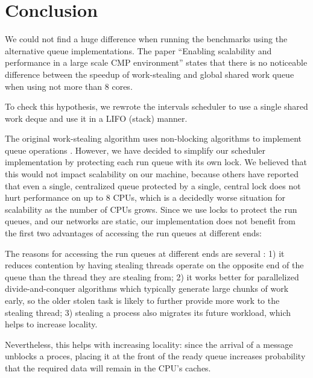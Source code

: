 
\chapter{Conclusion}
\label{chap:queues-conclusion}


We could not find a huge difference when running the benchmarks using
the alternative queue implementations. The paper ``Enabling
scalability and performance in a large scale CMP environment''
\cite{Saha2007} states that there is no noticeable difference between
the speedup of work-stealing and global shared work queue when using
not more than 8 cores.

To check this hypothesis, we rewrote the intervals scheduler to use a
single shared work deque and use it in a LIFO (stack) manner.


The original work-stealing algorithm uses non-blocking algorithms to
implement queue operations \cite{Arora2002}. However, we have decided
to simplify our scheduler implementation by protecting each run queue
with its own lock. We believed that this would not impact scalability
on our machine, because others \cite{Saha2007} have reported that even
a single, centralized queue protected by a single, central lock does
not hurt performance on up to 8 CPUs, which is a decidedly worse
situation for scalability as the number of CPUs grows. Since we use
locks to protect the run queues, and our networks are static, our
implementation does not benefit from the first two advantages of
accessing the run queues at different ends:

The reasons for accessing the run queues at different ends are several
\cite{Frigo1998}: 1) it reduces contention by having stealing threads
operate on the opposite end of the queue than the thread they are
stealing from; 2) it works better for parallelized divide-and-conquer
algorithms which typically generate large chunks of work early, so the
older stolen task is likely to further provide more work to the
stealing thread; 3) stealing a process also migrates its future
workload, which helps to increase locality.

Nevertheless, this helps with increasing locality: since the arrival
of a message unblocks a proces, placing it at the front of the ready
queue increases probability that the required data will remain in the
CPU’s caches.



